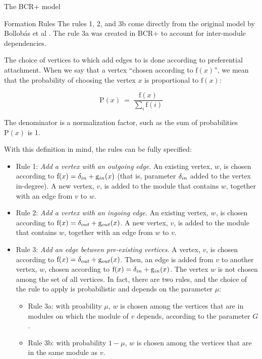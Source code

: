 \documentclass[11pt,twocolumn,a4paper,english]{article}
\begin{document}
\begin{section}{The BCR+ model}
\begin{subsection}{Formation Rules}
	The rules 1, 2, and 3b come directly from the original model by Bollobás et al \cite{Bollobas2003}. The rule 3a was created in BCR+ to account for inter-module dependencies.
	
	The choice of vertices to which add edges to is done according to preferential attachment. When we say that a vertex ``chosen according to $\mathrm{f}(x)$'', we mean that the probability of choosing the vertex $x$ is proportional to $\mathrm{f}(x)$:
	
	$$
	  \mathrm{P}(x) ~=~ \frac{ \mathrm{f}(x) }
	  { \displaystyle\sum_{i} \mathrm{f}(i) }
	$$
	
	The denominator is a normalization factor, such as the sum of probabilities $\mathrm{P}(x)$ is 1.
	
	With this definition in mind, the rules can be fully specified:
	
	\begin{itemize}
		\item Rule 1: \emph{Add a vertex with an outgoing edge}. An existing vertex, $w$, is chosen according to $\mathrm{f}(x) = \delta_{in} + \mathrm{g}_{in}(x)$ (that is, parameter $\delta_{in}$ added to the vertex in-degree). A new vertex, $v$, is added to the module that contains $w$, together with an edge from $v$ to $w$.

		\item Rule 2: \emph{Add a vertex with an ingoing edge}. An existing vertex, $w$, is chosen according to $\mathrm{f}(x) = \delta_{out} + \mathrm{g}_{out}(x)$. A new vertex, $v$, is added to the module that contains $w$, together with an edge from $w$ to $v$.

		\item Rule 3: \emph{Add an edge between pre-existing vertices}. A vertex, $v$, is chosen according to $\mathrm{f}(x) = \delta_{out} + \mathrm{g}_{out}(x)$. Then, an edge is added from $v$ to another vertex, $w$, chosen according to $\mathrm{f}(x) = \delta_{in} + \mathrm{g}_{in}(x)$. The vertex $w$ is not chosen among the set of all vertices. In fact, there are two rules, and the choice of the rule to apply is probabilistic and depends on the parameter $\mu$:

		\begin{itemize}
		  \item Rule 3a: with proability $\mu$, $w$ is chosen among the vertices that are in modules on which the module of $v$ depends, according to the parameter $G$.
		  \item Rule 3b: with probability $1 - \mu$, $w$ is chosen among the vertices that are in the same module as $v$.
		\end{itemize}
	\end{itemize}
	

\end{subsection}
\end{section}
\end{document}
